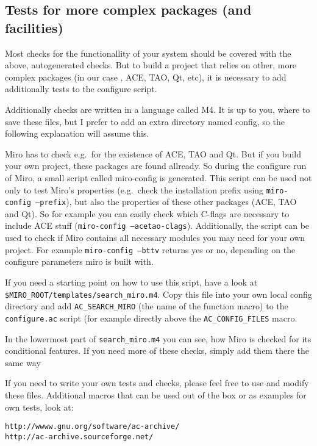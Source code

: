 \subsection{Tests for more complex packages (and facilities)}

Most checks for the functionallity of your system should be covered
with the above, autogenerated checks. But to build a project that
relies on other, more complex packages (in our case \miro, ACE, TAO,
Qt, etc), it is necessary to add additionally tests to the configure
script.

Additionally checks are written in a language called M4. It is up to
you, where to save these files, but I prefer to add an extra directory
named config, so the following explanation will assume this.

Miro has to check e.g.\ for the existence of ACE, TAO and Qt. But if you build your own
project, these packages are found allready. So during the configure run of Miro, a small
script called miro-config is generated. This script can be used not only to test Miro's
properties (e.g.\ check the installation prefix using \texttt{miro-config --prefix}), but
also the properties of these other packages (ACE, TAO and Qt). So for example you can
easily check which C-flags are necessary to include ACE stuff (\texttt{miro-config
  --acetao-clags}). Additionally, the script can be used to check if Miro contains all
necessary modules you may need for your own project. For example \texttt{miro-config
  --bttv} returns yes or no, depending on the configure parameters miro is built with.

If you need a starting point on how to use this sript, have a look at
\texttt{\$MIRO\_ROOT/\-templates/\-search\_miro.m4}. Copy this file into your own local
config directory and add \texttt{AC\_SEARCH\_MIRO} (the name of the function macro) to the
\texttt{configure.ac} script (for example directly above the {\tt AC\_CONFIG\_FILES} macro. 

In the lowermost part of \texttt{search\_miro.m4} you can see, how Miro is checked for its
conditional features. If you need more of these checks, simply add them there the same way

If you need to write your own tests and checks, please feel free to
use and modify these files. Additional macros that can be used out of
the box or as examples for own tests, look at:

\begin{verbatim}
http://wwww.gnu.org/software/ac-archive/
http://ac-archive.sourceforge.net/
\end{verbatim}


